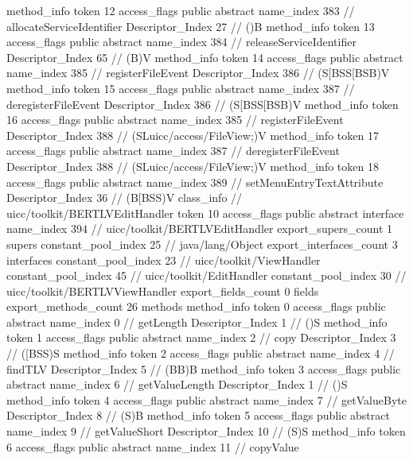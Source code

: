 {{{{				method_info {
					token	12
					access_flags	public abstract
					name_index	383		// allocateServiceIdentifier
					Descriptor_Index	27		// ()B
				}
				method_info {
					token	13
					access_flags	public abstract
					name_index	384		// releaseServiceIdentifier
					Descriptor_Index	65		// (B)V
				}
				method_info {
					token	14
					access_flags	public abstract
					name_index	385		// registerFileEvent
					Descriptor_Index	386		// (S[BSS[BSB)V
				}
				method_info {
					token	15
					access_flags	public abstract
					name_index	387		// deregisterFileEvent
					Descriptor_Index	386		// (S[BSS[BSB)V
				}
				method_info {
					token	16
					access_flags	public abstract
					name_index	385		// registerFileEvent
					Descriptor_Index	388		// (SLuicc/access/FileView;)V
				}
				method_info {
					token	17
					access_flags	public abstract
					name_index	387		// deregisterFileEvent
					Descriptor_Index	388		// (SLuicc/access/FileView;)V
				}
				method_info {
					token	18
					access_flags	public abstract
					name_index	389		// setMenuEntryTextAttribute
					Descriptor_Index	36		// (B[BSS)V
				}
			}
		}
		class_info {		// uicc/toolkit/BERTLVEditHandler
			token	10
			access_flags	public abstract interface
			name_index	394		// uicc/toolkit/BERTLVEditHandler
			export_supers_count	1
			supers {
				constant_pool_index	25		// java/lang/Object
			}
			export_interfaces_count	3
			interfaces {
				constant_pool_index	23		// uicc/toolkit/ViewHandler
				constant_pool_index	45		// uicc/toolkit/EditHandler
				constant_pool_index	30		// uicc/toolkit/BERTLVViewHandler
			}
			export_fields_count	0
			fields {
			}
			export_methods_count	26
			methods {
				method_info {
					token	0
					access_flags	public abstract
					name_index	0		// getLength
					Descriptor_Index	1		// ()S
				}
				method_info {
					token	1
					access_flags	public abstract
					name_index	2		// copy
					Descriptor_Index	3		// ([BSS)S
				}
				method_info {
					token	2
					access_flags	public abstract
					name_index	4		// findTLV
					Descriptor_Index	5		// (BB)B
				}
				method_info {
					token	3
					access_flags	public abstract
					name_index	6		// getValueLength
					Descriptor_Index	1		// ()S
				}
				method_info {
					token	4
					access_flags	public abstract
					name_index	7		// getValueByte
					Descriptor_Index	8		// (S)B
				}
				method_info {
					token	5
					access_flags	public abstract
					name_index	9		// getValueShort
					Descriptor_Index	10		// (S)S
				}
				method_info {
					token	6
					access_flags	public abstract
					name_index	11		// copyValue
}}}}}
